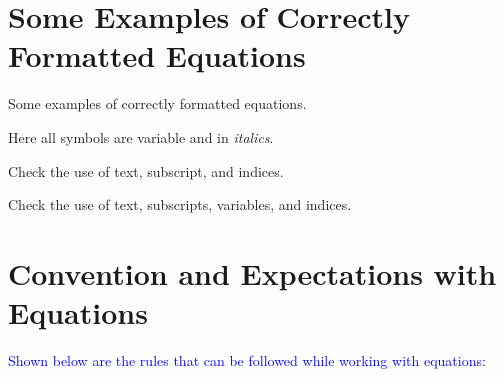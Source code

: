 \documentclass[phd]{ndsu-thesis-2022}
\newcommand\italk[1]{\textcolor{blue}{#1}}  %
\begin{document}
\section{Some Examples of Correctly Formatted Equations}

Some examples of correctly formatted equations. 


Here all symbols are variable and in \textit{italics}.


Check the use of text, subscript, and indices. 


Check the use of text, subscripts, variables, and indices. 


\section{Convention and Expectations with Equations}

\italk{Shown below are the rules that can be followed while working with equations:}
\end{document}
